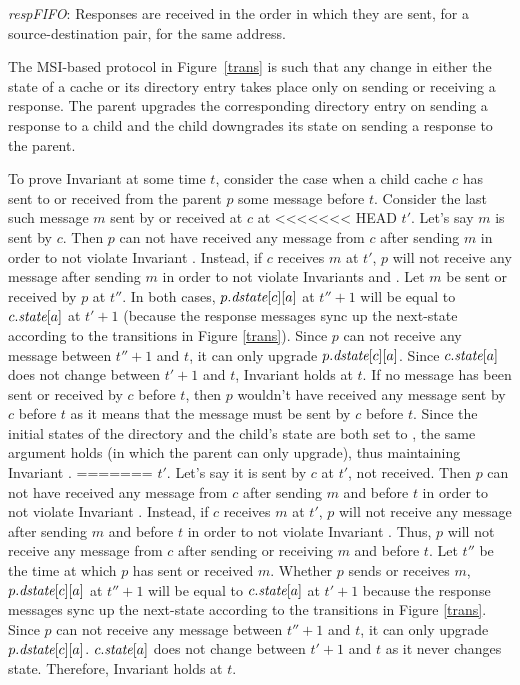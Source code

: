 \begin{inv}
\textit{respFIFO}: Responses are received in the order in which they are sent,
for a source-destination pair, for the same address.
\label{respFIFO}
\end{inv}

The MSI-based protocol in Figure~\ref{trans} is such that any change in either
the state of a cache or its directory entry takes place only on sending or
receiving a response. The parent upgrades the corresponding directory entry on
sending a response to a child and the child downgrades its state on
sending a response to the parent.

To prove Invariant  at some time $t$, consider the case
when a child cache $c$ has sent to or received from the parent $p$ some message
before $t$. Consider the last such message $m$ sent by or received at $c$ at
<<<<<<< HEAD
$t'$. Let's say $m$ is sent by $c$. Then $p$ can not have received any message
from $c$ after sending $m$ in order to not violate Invariant .
Instead, if $c$ receives $m$ at $t'$, $p$ will not receive any message after
sending $m$ in order to not violate Invariants  and
. Let $m$ be sent or received by $p$ at $t''$. In both cases,
$p.\textit{dstate}[c][a]$ at $t''+1$ will be equal to $c.\textit{state}[a]$ at $t'+1$ (because
the response messages sync up the next-state according to the transitions in
Figure \ref{trans}). Since $p$ can not receive any message between $t''+1$ and
$t$, it can only upgrade $p.\textit{dstate}[c][a]$. Since $c.\textit{state}[a]$ does not change
between $t'+1$ and $t$, Invariant  holds at $t$. If no
message has been sent or received by $c$ before $t$, then $p$
wouldn't have received any message sent by $c$ before $t$ as it means that the
message must be sent by $c$ before $t$. Since the initial states of the
directory and the child's state are both set to \In{}, the same argument holds
(in which the parent can only upgrade), thus maintaining Invariant
.
=======
$t'$. Let's say it is sent by $c$ at $t'$, not received. Then $p$ can not have
received any message from $c$ after sending $m$ and before $t$ in order to not
violate Invariant .  Instead, if $c$ receives $m$ at $t'$,
$p$ will not receive any message after sending $m$ and before $t$ in order to
not violate Invariant . Thus, $p$ will not receive any message
from $c$ after sending or receiving $m$ and before $t$.  Let $t''$ be the time
at which $p$ has sent or received $m$. Whether $p$ sends or receives $m$,
$p.\textit{dstate}[c][a]$ at $t''+1$ will be equal to $c.\textit{state}[a]$ at $t'+1$ because
the response messages sync up the next-state according to the transitions in
Figure \ref{trans}. Since $p$ can not receive any message between $t''+1$ and
$t$, it can only upgrade $p.\textit{dstate}[c][a]$. $c.\textit{state}[a]$ does not change
between $t'+1$ and $t$ as it never changes state. Therefore, Invariant
 holds at $t$.


